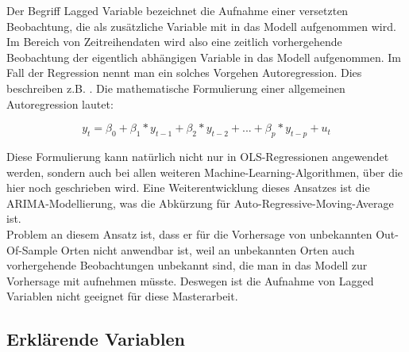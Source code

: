 \documentclass[a4paper,12pt]{thesis}
\begin{document}
Der Begriff Lagged Variable bezeichnet die Aufnahme einer versetzten Beobachtung, die als zusätzliche Variable mit in das Modell aufgenommen wird. Im Bereich von Zeitreihendaten wird also eine zeitlich vorhergehende Beobachtung der eigentlich abhängigen Variable in das Modell aufgenommen. Im Fall der Regression nennt man ein solches Vorgehen Autoregression. Dies beschreiben z.B. \cite{Stock2015a}. Die mathematische Formulierung einer allgemeinen Autoregression lautet:

\begin{equation}
	\label{SVM:Autoregression}
	y_t = \beta_0 + \beta_1 * y_{t-1} + \beta_2 * y_{t-2} + ... + \beta_p * y_{t-p} + u_t
\end{equation}

Diese Formulierung kann natürlich nicht nur in OLS-Regressionen angewendet werden, sondern auch bei allen weiteren Machine-Learning-Algorithmen, über die hier noch geschrieben wird. Eine Weiterentwicklung dieses Ansatzes ist die ARIMA-Modellierung, was die Abkürzung für Auto-Regressive-Moving-Average ist.\\
Problem an diesem Ansatz ist, dass er für die Vorhersage von unbekannten Out-Of-Sample Orten nicht anwendbar ist, weil an unbekannten Orten auch vorhergehende Beobachtungen unbekannt sind, die man in das Modell zur Vorhersage mit aufnehmen müsste. Deswegen ist die Aufnahme von Lagged Variablen nicht geeignet für diese Masterarbeit.

\subsection{Erklärende Variablen}
\end{document}
